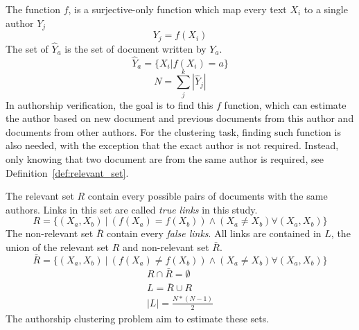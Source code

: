 \begin{definition}[Authorship]
  The function $f$, is a surjective-only function which map every text $X_i$ to a single author $Y_j$
  \begin{equation}
    Y_j = f(X_i)
  \end{equation}
  The set of $\hat{Y}_a$ is the set of document written by $Y_a$.
  \begin{equation}
    \hat{Y}_a = \{X_i | f(X_i) = a\}
  \end{equation}
  \begin{equation}
    N = \sum_{j}^k |\hat{Y}_j|
  \end{equation}
  In authorship verification, the goal is to find this $f$ function, which can estimate the author based on new document and previous documents from this author and documents from other authors.
  For the clustering task, finding such function is also needed, with the exception that the exact author is not required.
  Instead, only knowing that two document are from the same author is required, see Definition~\ref{def:relevant_set}.
\end{definition}

\begin{definition}
  The relevant set $R$ contain every possible pairs of documents with the same authors.
  Links in this set are called \textit{true links} in this study.
  \begin{equation}
    R = \{(X_a, X_b)\ |\ \left( f(X_a) = f(X_b) \right) \land \left(X_a \neq X_b \right) \forall (X_a, X_b)\}
  \end{equation}
  The non-relevant set $\bar{R}$ contain every \textit{false links}.
  All links are contained in $L$, the union of the relevant set $R$ and non-relevant set $\bar{R}$.
  \begin{equation}
    \bar{R} = \{(X_a, X_b)\ |\ \left( f(X_a) \neq f(X_b) \right) \land \left(X_a \neq X_b \right) \forall (X_a, X_b)\}
  \end{equation}
  \begin{gather}
    R \cap \bar{R} = \emptyset \\
    L = \bar{R} \cup R \\
    |L| = \frac{N * (N-1)}{2}
  \end{gather}
  The authorship clustering problem aim to estimate these sets.
\end{definition}

